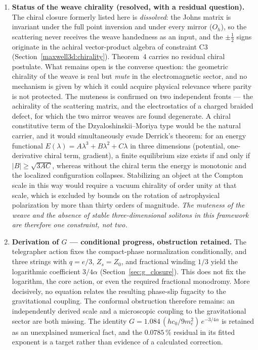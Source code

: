 \documentclass[11pt,a4paper]{article}
\theoremstyle{plain}
\theoremstyle{remark}
\begin{document}
\begin{enumerate}
    \item \textbf{Status of the weave chirality (resolved, with a residual question).} The chiral closure formerly listed here is \emph{dissolved}: the Johns matrix is invariant under the full point inversion and under every mirror ($O_h$), so the scattering never receives the weave handedness as an input, and the $\pm\tfrac12$ signs originate in the achiral vector-product algebra of constraint C3 (Section~\ref{maxwell3d:chirality}). Theorem~4 carries no residual chiral postulate. What remains open is the converse question: the geometric chirality of the weave is real but \emph{mute} in the electromagnetic sector, and no mechanism is given by which it could acquire physical relevance where parity is not protected. The muteness is confirmed on two independent fronts --- the achirality of the scattering matrix, and the electrostatics of a charged braided defect, for which the two mirror weaves are found degenerate. A chiral constitutive term of the Dzyaloshinskii--Moriya type would be the natural carrier, and it would simultaneously evade Derrick's theorem: for an energy functional $E(\lambda) = A\lambda^3 + B\lambda^2 + C\lambda$ in three dimensions (potential, one-derivative chiral term, gradient), a finite equilibrium size exists if and only if $|B| \geq \sqrt{3AC}$, whereas without the chiral term the energy is monotonic and the localized configuration collapses. Stabilizing an object at the Compton scale in this way would require a vacuum chirality of order unity at that scale, which is excluded by bounds on the rotation of astrophysical polarization by more than thirty orders of magnitude. \emph{The muteness of the weave and the absence of stable three-dimensional solitons in this framework are therefore one constraint, not two.}
    \item \textbf{Derivation of $G$ --- conditional progress, obstruction retained.} The telegrapher action fixes the compact-phase normalization conditionally, and three strings with $q=e/3$, $Z_s=Z_0$, and fractional winding $1/3$ yield the logarithmic coefficient $3/4\alpha$ (Section~\ref{sec:g_closure}). This does not fix the logarithm, the core action, or even the required fractional monodromy. More decisively, no equation relates the resulting phase-slip fugacity to the gravitational coupling. The conformal obstruction therefore remains: an independently derived scale and a microscopic coupling to the gravitational sector are both missing. The identity $G = 1.084\,(hc_0/9m_e^2)\,e^{-3/4\alpha}$ is retained as an unexplained numerical fact, and the $0.0785\,\%$ residual in its fitted exponent is a target rather than evidence of a calculated correction.

\end{enumerate}
\end{document}
